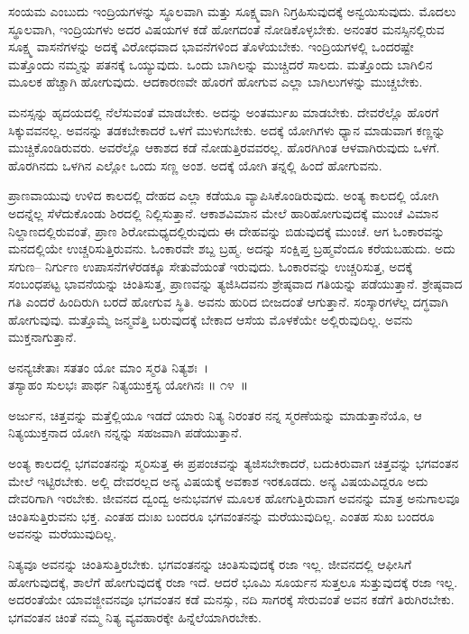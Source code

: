 ಸಂಯಮ ಎಂಬುದು ಇಂದ್ರಿಯಗಳನ್ನು ಸ್ಥೂಲವಾಗಿ ಮತ್ತು ಸೂಕ್ಷ್ಮವಾಗಿ ನಿಗ್ರಹಿಸುವುದಕ್ಕೆ ಅನ್ವಯಿಸುವುದು. ಮೊದಲು ಸ್ಥೂಲವಾಗಿ, ಇಂದ್ರಿಯಗಳು ಅದರ ವಿಷಯಗಳ ಕಡೆ ಹೋಗದಂತೆ ನೋಡಿಕೊಳ್ಳಬೇಕು. ಅನಂತರ ಮನಸ್ಸಿನಲ್ಲಿರುವ ಸೂಕ್ಷ್ಮ ವಾಸನೆಗಳನ್ನು ಅದಕ್ಕೆ ವಿರೋಧವಾದ ಭಾವನೆಗಳಿಂದ ತೊಳೆಯಬೇಕು. ಇಂದ್ರಿಯಗಳಲ್ಲಿ ಒಂದರಷ್ಟೇ ಮತ್ತೊಂದು ನಮ್ಮನ್ನು ಪತನಕ್ಕೆ ಒಯ್ಯುವುದು. ಒಂದು ಬಾಗಿಲನ್ನು ಮುಚ್ಚಿದರೆ ಸಾಲದು. ಮತ್ತೊಂದು ಬಾಗಿಲಿನ ಮೂಲಕ ಹೆಚ್ಚಾಗಿ ಹೋಗುವುದು. ಆದಕಾರಣವೇ ಹೊರಗೆ ಹೋಗುವ ಎಲ್ಲಾ ಬಾಗಿಲುಗಳನ್ನು ಮುಚ್ಚಬೇಕು.

ಮನಸ್ಸನ್ನು ಹೃದಯದಲ್ಲಿ ನೆಲೆಸುವಂತೆ ಮಾಡಬೇಕು. ಅದನ್ನು ಅಂತರ್ಮುಖ ಮಾಡಬೇಕು. ದೇವರೆಲ್ಲೊ ಹೊರಗೆ ಸಿಕ್ಕುವವನಲ್ಲ. ಅವನನ್ನು ತಡಕಬೇಕಾದರೆ ಒಳಗೆ ಮುಳುಗಬೇಕು. ಅದಕ್ಕೆ ಯೋಗಿಗಳು ಧ್ಯಾನ ಮಾಡುವಾಗ ಕಣ್ಣನ್ನು ಮುಚ್ಚಿಕೊಂಡಿರುವರು. ಅವರೆಲ್ಲೊ ಆಕಾಶದ ಕಡೆ ನೋಡುತ್ತಿರವವರಲ್ಲ. ಹೊರಗಿಗಿಂತ ಆಳವಾಗಿರುವುದು ಒಳಗೆ. ಹೊರಗಿನದು ಒಳಗಿನ ಎಲ್ಲೋ ಒಂದು ಸಣ್ಣ ಅಂಶ. ಅದಕ್ಕೆ ಯೋಗಿ ತನ್ನಲ್ಲಿ ಹಿಂದೆ ಹೋಗುವನು.

ಪ್ರಾಣವಾಯುವು ಉಳಿದ ಕಾಲದಲ್ಲಿ ದೇಹದ ಎಲ್ಲಾ ಕಡೆಯೂ ವ್ಯಾಪಿಸಿಕೊಂಡಿರುವುದು. ಅಂತ್ಯ ಕಾಲದಲ್ಲಿ ಯೋಗಿ ಅದನ್ನೆಲ್ಲ ಸೆಳೆದುಕೊಂಡು ಶಿರದಲ್ಲಿ ನಿಲ್ಲಿಸುತ್ತಾನೆ. ಆಕಾಶವಿಮಾನ ಮೇಲೆ ಹಾರಿಹೋಗುವುದಕ್ಕೆ ಮುಂಚೆ ವಿಮಾನ ನಿಲ್ದಾಣದಲ್ಲಿರುವಂತೆ, ಪ್ರಾಣ ಶಿರೋಮಧ್ಯ\-ದಲ್ಲಿರುವುದು ಈ ದೇಹವನ್ನು ಬಿಡುವುದಕ್ಕೆ ಮುಂಚೆ. ಆಗ ಓಂಕಾರವನ್ನು ಮನದಲ್ಲಿಯೇ ಉಚ್ಚರಿಸು\-ತ್ತಿರುವನು. ಓಂಕಾರವೇ ಶಬ್ದ ಬ್ರಹ್ಮ. ಅದನ್ನು ಸಂಕ್ಷಿಪ್ತ ಬ್ರಹ್ಮವೆಂದೂ ಕರೆಯಬಹುದು. ಅದು ಸಗುಣ– ನಿರ್ಗುಣ ಉಪಾಸನೆಗಳೆರಡಕ್ಕೂ ಸೇತುವೆಯಂತೆ ಇರುವುದು. ಓಂಕಾರವನ್ನು ಉಚ್ಚರಿಸುತ್ತ, ಅದಕ್ಕೆ ಸಂಬಂಧಪಟ್ಟ ಭಾವನೆಯನ್ನು ಚಿಂತಿಸುತ್ತ, ಪ್ರಾಣವನ್ನು ತ್ಯಜಿಸಿದವನು ಶ್ರೇಷ್ಠವಾದ ಗತಿಯನ್ನು ಪಡೆಯುತ್ತಾನೆ. ಶ್ರೇಷ್ಠವಾದ ಗತಿ ಎಂದರೆ ಹಿಂದಿರುಗಿ ಬರದೆ ಹೋಗುವ ಸ್ಥಿತಿ. ಅವನು ಹುರಿದ ಬೀಜದಂತೆ ಆಗುತ್ತಾನೆ. ಸಂಸ್ಕಾರಗಳೆಲ್ಲ ದಗ್ಧವಾಗಿ ಹೋಗುವುವು. ಮತ್ತೊಮ್ಮೆ ಜನ್ಮವೆತ್ತಿ ಬರುವುದಕ್ಕೆ ಬೇಕಾದ ಆಸೆಯ ಮೊಳಕೆಯೇ ಅಲ್ಲಿರುವುದಿಲ್ಲ. ಅವನು ಮುಕ್ತನಾಗುತ್ತಾನೆ.

\begin{shloka}
ಅನನ್ಯಚೇತಾಃ ಸತತಂ ಯೋ ಮಾಂ ಸ್ಮರತಿ ನಿತ್ಯಶಃ~।\\ತಸ್ಯಾಹಂ ಸುಲಭಃ ಪಾರ್ಥ ನಿತ್ಯಯುಕ್ತಸ್ಯ ಯೋಗಿನಃ \hfill॥ ೧೪~॥
\end{shloka}

\begin{artha}
ಅರ್ಜುನ, ಚಿತ್ತವನ್ನು ಮತ್ತೆಲ್ಲಿಯೂ ಇಡದೆ ಯಾರು ನಿತ್ಯ ನಿರಂತರ ನನ್ನ ಸ್ಮರಣೆಯನ್ನು ಮಾಡು\-ತ್ತಾನೆಯೊ, ಆ ನಿತ್ಯಯುಕ್ತನಾದ ಯೋಗಿ ನನ್ನನ್ನು ಸಹಜವಾಗಿ ಪಡೆಯುತ್ತಾನೆ.
\end{artha}

ಅಂತ್ಯ ಕಾಲದಲ್ಲಿ ಭಗವಂತನನ್ನು ಸ್ಮರಿಸುತ್ತ ಈ ಪ್ರಪಂಚವನ್ನು ತ್ಯಜಿಸಬೇಕಾದರೆ, ಬದುಕಿರುವಾಗ ಚಿತ್ತವನ್ನು ಭಗವಂತನ ಮೇಲೆ ಇಟ್ಟಿರಬೇಕು. ಅಲ್ಲಿ ದೇವರಲ್ಲದ ಅನ್ಯ ವಿಷಯಕ್ಕೆ ಅವಕಾಶ ಇರಕೂಡದು. ಅನ್ಯ ವಿಷಯವಿದ್ದರೂ ಅದು ದೇವರಿಗಾಗಿ ಇರಬೇಕು. ಜೀವನದ ದ್ವಂದ್ವ ಅನುಭವಗಳ ಮೂಲಕ ಹೋಗುತ್ತಿರುವಾಗ ಅವನನ್ನು ಮಾತ್ರ ಅನುಗಾಲವೂ ಚಿಂತಿಸುತ್ತಿರುವನು ಭಕ್ತ. ಎಂತಹ ದುಃಖ ಬಂದರೂ ಭಗವಂತನನ್ನು ಮರೆಯುವುದಿಲ್ಲ. ಎಂತಹ ಸುಖ ಬಂದರೂ ಅವನನ್ನು ಮರೆಯುವುದಿಲ್ಲ.

ನಿತ್ಯವೂ ಅವನನ್ನು ಚಿಂತಿಸುತ್ತಿರಬೇಕು. ಭಗವಂತನನ್ನು ಚಿಂತಿಸುವುದಕ್ಕೆ ರಜಾ ಇಲ್ಲ. ಜೀವನದಲ್ಲಿ ಆಫೀಸಿಗೆ ಹೋಗುವುದಕ್ಕೆ, ಶಾಲೆಗೆ ಹೋಗುವುದಕ್ಕೆ ರಜಾ ಇದೆ. ಆದರೆ ಭೂಮಿ ಸೂರ್ಯನ ಸುತ್ತಲೂ ಸುತ್ತುವುದಕ್ಕೆ ರಜಾ ಇಲ್ಲ. ಅದರಂತೆಯೇ ಯಾವಜ್ಜೀವನವೂ ಭಗವಂತನ ಕಡೆ ಮನಸ್ಸು, ನದಿ ಸಾಗರಕ್ಕೆ ಸೇರುವಂತೆ ಅವನ ಕಡೆಗೆ ತಿರುಗಿರಬೇಕು. ಭಗವಂತನ ಚಿಂತೆ ನಮ್ಮ ನಿತ್ಯ ವ್ಯವಹಾರಕ್ಕೇ ಹಿನ್ನೆಲೆಯಾಗಿರಬೇಕು.

